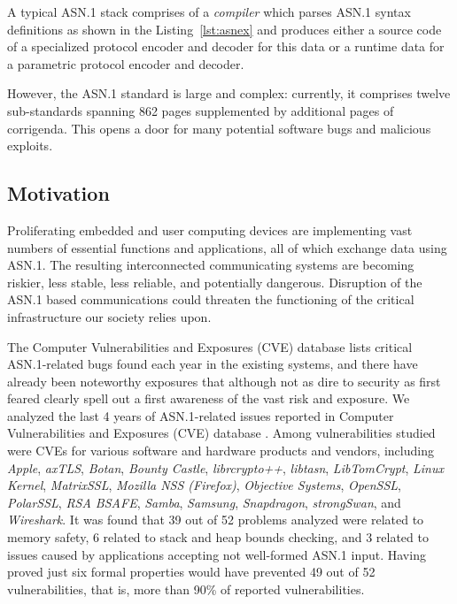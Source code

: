 \documentclass[acmsmall,nonacm]{acmart}
\begin{document}
A typical ASN.1 stack comprises of a \textit{compiler} which parses
ASN.1 syntax definitions as shown in the Listing~\ref{lst:asnex} and
produces either a source code of a specialized protocol encoder and
decoder for this data or a runtime data for a parametric protocol
encoder and decoder.

However, the ASN.1 standard \cite{ASN1Intro} is large and complex:
currently, it comprises twelve sub-standards spanning 862 pages
supplemented by additional pages of corrigenda\cite{ASN1Intro}. This opens
a door for many potential software bugs and malicious exploits.
  
\subsection{Motivation}

Proliferating embedded and user computing devices are implementing
vast numbers of essential functions and applications, all of which
exchange data using ASN.1. The resulting interconnected communicating
systems are becoming riskier, less stable, less reliable, and
potentially dangerous. Disruption of the ASN.1 based communications
could threaten the functioning of the critical infrastructure our
society relies upon.


The Computer Vulnerabilities and Exposures (CVE) database
\cite{CVE} lists critical ASN.1-related bugs found each year in
the existing systems, and there have already been noteworthy exposures
\cite{OpenSSLMemoryCorruption} that although not as dire to security as first feared
\cite{ASN1Flaw} clearly spell out a first awareness of the vast risk and
exposure. We analyzed the last 4 years of ASN.1-related issues
reported in Computer Vulnerabilities and Exposures (CVE) database
\cite{CVEaddon}. Among vulnerabilities studied were CVEs for various
software and hardware products and vendors, including \textit{Apple},
\textit{axTLS}, \textit{Botan}, \textit{Bounty Castle},
\textit{librcrypto++}, \textit{libtasn}, \textit{LibTomCrypt},
\textit{Linux Kernel}, \textit{MatrixSSL}, \textit{Mozilla NSS
  (Firefox)}, \textit{Objective Systems}, \textit{OpenSSL},
\textit{PolarSSL}, \textit{RSA BSAFE}, \textit{Samba},
\textit{Samsung}, \textit{Snapdragon}, \textit{strongSwan}, and
\textit{Wireshark}. It was found that 39 out of 52 problems analyzed
were related to memory safety, 6 related to stack and heap bounds
checking, and 3 related to issues caused by applications accepting not
well-formed ASN.1 input. Having proved just six formal properties
would have prevented 49 out of 52 vulnerabilities, that is, more than
90\% of reported vulnerabilities.
\end{document}
